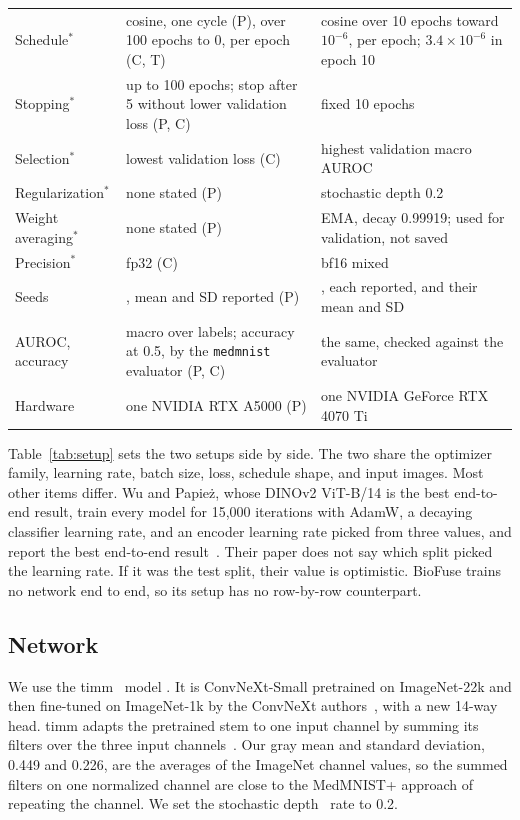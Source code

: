 \documentclass[conference]{IEEEtran}
\newif\ifanycitation
\let\citeAnyKey\cite
\renewcommand{\cite}{\global\anycitationtrue\citeAnyKey}
\begin{document}
\begin{table}[t]
\begin{tabular}{@{}l>{\raggedright\arraybackslash}p{}>{\raggedright\arraybackslash}p{}@{}}
Schedule$^\ast$ & cosine, one cycle (P), over 100 epochs to 0, per epoch (C, T) & cosine over 10 epochs toward $10^{-6}$, per epoch; $3.4\times10^{-6}$ in epoch 10 \\
Stopping$^\ast$ & up to 100 epochs; stop after 5 without lower validation loss (P, C) & fixed 10 epochs \\
Selection$^\ast$ & lowest validation loss (C) & highest validation macro AUROC \\
Regularization$^\ast$ & none stated (P) & stochastic depth 0.2 \\
Weight averaging$^\ast$ & none stated (P) & EMA, decay 0.99919; used for validation, not saved \\
Precision$^\ast$ & fp32 (C) & bf16 mixed \\
Seeds & 3, mean and SD reported (P) & 3, each reported, and their mean and SD \\
AUROC, accuracy & macro over labels; accuracy at 0.5, by the \texttt{medmnist} evaluator (P, C) & the same, checked against the evaluator \\
Hardware & one NVIDIA RTX A5000 (P) & one NVIDIA GeForce RTX 4070 Ti \\
\bottomrule
\end{tabular}
\end{table}

Table~\ref{tab:setup} sets the two setups side by side. The two share the optimizer
family, learning rate, batch size, loss, schedule shape, and input images. Most other
items differ. Wu and Papie\.{z}, whose DINOv2 ViT-B/14 is the best end-to-end result,
train every model for 15,000 iterations with AdamW, a decaying classifier learning rate,
and an encoder learning rate picked from three values, and report the best end-to-end
result~\cite{wu2025rethinking}. Their paper does not say which split picked the learning
rate. If it was the test split, their value is optimistic. BioFuse trains no network end
to end, so its setup has no row-by-row counterpart.

\subsection{Network}

We use the timm~\cite{wightman2019timm} model . It is
ConvNeXt-Small pretrained on ImageNet-22k and then fine-tuned on ImageNet-1k by the
ConvNeXt authors~\cite{liu2022convnext}, with a new 14-way head. timm adapts the
pretrained stem to one input channel by summing its filters over the three input
channels~\cite{timm1031adapt}. Our gray mean and standard deviation, 0.449 and 0.226, are
the averages of the ImageNet channel values, so the summed filters on one normalized
channel are close to the MedMNIST+ approach of repeating the channel. We set the
stochastic depth~\cite{huang2016stochastic} rate to 0.2.
\end{document}
